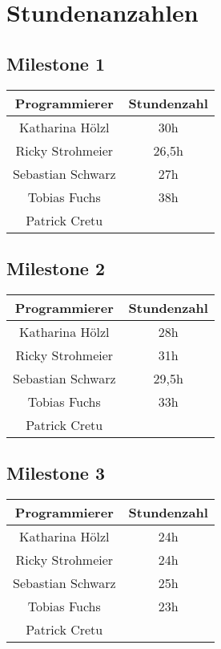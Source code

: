 \chapter{Stundenanzahlen}
\section{Milestone 1}
\begin{center}
	\begin{tabular}{|c|c|}
		\hline \textbf{Programmierer} & \textbf{Stundenzahl} \\ 
		\hline Katharina Hölzl  & 30h \\ 
		\hline Ricky Strohmeier & 26,5h \\ 
		\hline Sebastian Schwarz & 27h \\ 
		\hline Tobias Fuchs &  38h\\ 
		\hline Patrick Cretu &  \\ 
		\hline 
	\end{tabular}
\end{center} 
\section{Milestone 2}
\begin{center}
	\begin{tabular}{|c|c|}
		\hline \textbf{Programmierer} & \textbf{Stundenzahl} \\ 
		\hline Katharina Hölzl  & 28h  \\ 
		\hline Ricky Strohmeier & 31h\\ 
		\hline Sebastian Schwarz & 29,5h \\ 
		\hline Tobias Fuchs & 33h \\ 
		\hline Patrick Cretu &  \\ 
		\hline 
	\end{tabular}
\end{center} 
\section{Milestone 3}
\begin{center}
	\begin{tabular}{|c|c|}
		\hline \textbf{Programmierer} & \textbf{Stundenzahl} \\ 
		\hline Katharina Hölzl  & 24h \\ 
		\hline Ricky Strohmeier & 24h\\ 
		\hline Sebastian Schwarz & 25h \\ 
		\hline Tobias Fuchs &  23h\\ 
		\hline Patrick Cretu &  \\ 
		\hline 
	\end{tabular}
\end{center} 

